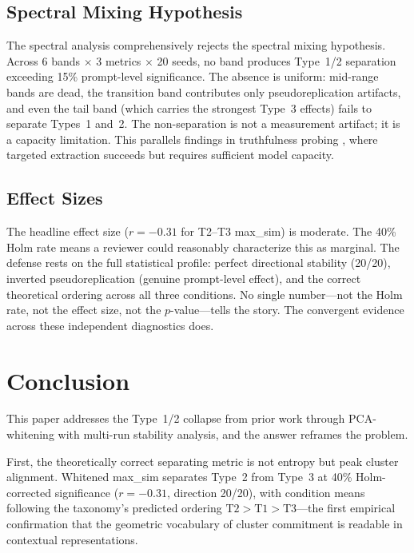 \documentclass[11pt]{article}
\begin{document}
\subsection{Spectral Mixing Hypothesis}

The spectral analysis comprehensively rejects the spectral mixing hypothesis. Across 6 bands $\times$ 3 metrics $\times$ 20 seeds, no band produces Type~1/2 separation exceeding 15\% prompt-level significance. The absence is uniform: mid-range bands are dead, the transition band contributes only pseudoreplication artifacts, and even the tail band (which carries the strongest Type~3 effects) fails to separate Types~1 and~2. The non-separation is not a measurement artifact; it is a capacity limitation. This parallels findings in truthfulness probing \citep{burns2023discovering, azaria2023internal}, where targeted extraction succeeds but requires sufficient model capacity.

\subsection{Effect Sizes}

The headline effect size ($r = -0.31$ for T2--T3 max\_sim) is moderate. The 40\% Holm rate means a reviewer could reasonably characterize this as marginal. The defense rests on the full statistical profile: perfect directional stability (20/20), inverted pseudoreplication (genuine prompt-level effect), and the correct theoretical ordering across all three conditions. No single number---not the Holm rate, not the effect size, not the $p$-value---tells the story. The convergent evidence across these independent diagnostics does.


\section{Conclusion}

This paper addresses the Type~1/2 collapse from prior work through PCA-whitening with multi-run stability analysis, and the answer reframes the problem.

First, the theoretically correct separating metric is not entropy but peak cluster alignment. Whitened max\_sim separates Type~2 from Type~3 at 40\% Holm-corrected significance ($r = -0.31$, direction 20/20), with condition means following the taxonomy's predicted ordering $\text{T2} > \text{T1} > \text{T3}$---the first empirical confirmation that the geometric vocabulary of cluster commitment is readable in contextual representations.
\end{document}
